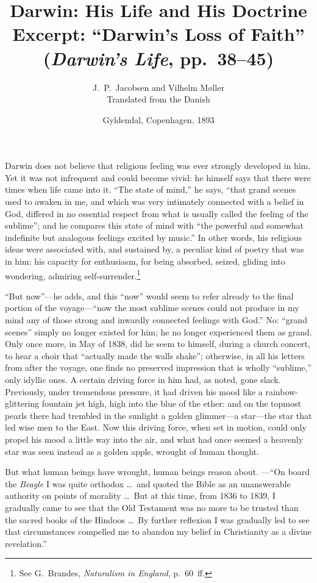 \documentclass[12pt,a4paper]{article}
\title{\textbf{Darwin: His Life and His Doctrine}\\[0.4em]
\large Excerpt: ``Darwin's Loss of Faith''\\
(\emph{Darwin's Life}, pp.\ 38--45)}
\author{J.\ P.\ Jacobsen and Vilhelm Møller\\[4pt]
  \small Translated from the Danish}
\date{Gyldendal, Copenhagen, 1893}
\begin{document}
\maketitle
\thispagestyle{fancy}

\bigskip

\noindent Darwin does not believe that religious feeling was ever
strongly developed in him. Yet it was not infrequent and could
become vivid: he himself says that there were times when life
came into it. ``The state of mind,'' he says, ``that grand scenes
used to awaken in me, and which was very intimately connected
with a belief in God, differed in no essential respect from what
is usually called the feeling of the sublime''; and he compares
this state of mind with ``the powerful and somewhat indefinite
but analogous feelings excited by music.'' In other words, his
religious ideas were associated with, and sustained by, a
peculiar kind of poetry that was in him: his capacity for
enthusiasm, for being absorbed, seized, gliding into wondering,
admiring self-surrender.\footnote{See G.\ Brandes,
\emph{Naturalism in England}, p.\ 60~ff.}

``But now''---he adds, and this ``now'' would seem to refer
already to the final portion of the voyage---``now the most
sublime scenes could not produce in my mind any of those strong
and inwardly connected feelings with God.'' No: ``grand scenes''
simply no longer existed for him; he no longer experienced them
as grand. Only once more, in May of 1838, did he seem to
himself, during a church concert, to hear a choir that ``actually
made the walls shake''; otherwise, in all his letters from after
the voyage, one finds no preserved impression that is wholly
``sublime,'' only idyllic ones. A certain driving force in him
had, as noted, gone slack. Previously, under tremendous pressure,
it had driven his mood like a rainbow-glittering fountain jet
high, high into the blue of the ether: and on the topmost pearls
there had trembled in the sunlight a golden glimmer---a
star---the star that led wise men to the East. Now this driving
force, when set in motion, could only propel his mood a little
way into the air, and what had once seemed a heavenly star was
seen instead as a golden apple, wrought of human thought.

But what human beings have wrought, human beings reason about.
---``On board the \emph{Beagle} I was quite orthodox \ldots\ and
quoted the Bible as an unanswerable authority on points of
morality \ldots\ But at this time, from 1836 to 1839, I gradually
came to see that the Old Testament was no more to be trusted than
the sacred books of the Hindoos \ldots\ By further reflexion I
was gradually led to see that circumstances compelled me to
abandon my belief in Christianity as a divine revelation.''
\end{document}
